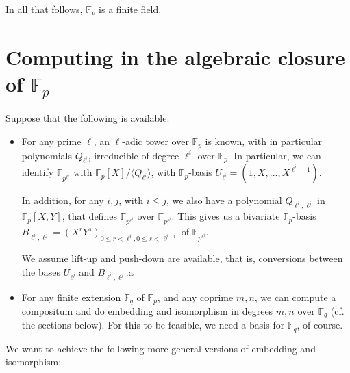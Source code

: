 \documentclass[12pt]{article}
\def\F {\ensuremath{\mathbb{F}}}
\begin{document}

In all that follows, $\F_p$ is a finite field.


\section{Computing in the algebraic closure of $\F_p$}

Suppose that the following is available:
\begin{itemize}
\item For any prime $\ell$, an $\ell$-adic tower over $\F_p$ is known,
  with in particular polynomials $Q_{\ell^i}$, irreducible of degree
  $\ell^i$ over $\F_p$. In particular, we can identify  $\F_{p^{\ell^i}}$
  with $\F_p[X]/\langle Q_{\ell^i} \rangle$, with $\F_p$-basis
  $U_{\ell^i}=(1,X,\dots,X^{\ell^i-1})$. 

  In addition, for any $i,j$, with $i \le j$, we also have a
  polynomial $Q_{\ell^i,\ell^j}$ in $\F_p[X,Y]$, that defines
  $\F_{p^{\ell^j}}$ over $\F_{p^{\ell^j}}$. This gives us a bivariate
  $\F_p$-basis $B_{\ell^i,\ell^j}=(X^r Y^s)_{0 \le r < \ell^i, 0 \le s
    < \ell^{j-i}}$ of $\F_{p^{\ell^j}}$.
  
  We assume lift-up and push-down are available, that is, conversions
  between the bases $U_{\ell^j}$ and $B_{\ell^i,\ell^j}$.a

\item For any finite extension $\F_q$ of $\F_p$, and any coprime
  $m,n$, we can compute a compositum and do embedding and isomorphism
  in degrees $m,n$ over $\F_q$ (cf. the sections below). For this to
  be feasible, we need a basis for $\F_q$, of course.
\end{itemize}
We want to achieve the following more general versions of embedding
and isomorphism:
\end{document}
